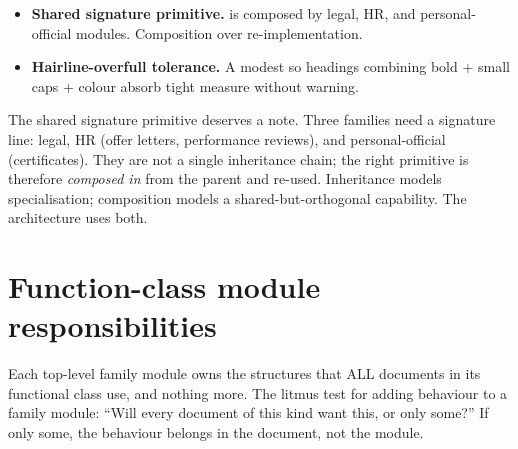 \documentclass[11pt]{article}
\begin{document}
\begin{itemize}
         stamps out a tcolorbox-backed,
        counter-driven, optionally-titled environment in a single line.
        Three legal callouts, four installation steps, an ADR header,
        and the test-case header all use the same factory.
  \item \textbf{Shared signature primitive.} 
        is composed by legal, HR, and personal-official modules.
        Composition over re-implementation.
  \item \textbf{Hairline-overfull tolerance.} A modest
         so headings combining bold + small caps +
        colour absorb tight measure without warning.
\end{itemize}

\begin{notebox}
The shared signature primitive deserves a note. Three families need a
signature line: legal, HR (offer letters, performance reviews),
and personal-official (certificates). They are not a single inheritance
chain; the right primitive is therefore \emph{composed in} from the
parent and re-used. Inheritance models specialisation; composition
models a shared-but-orthogonal capability. The architecture uses both.
\end{notebox}

\section{Function-class module responsibilities}

Each top-level family module owns the structures that ALL documents in
its functional class use, and nothing more. The litmus test for adding
behaviour to a family module: ``Will every document of this kind want
this, or only some?'' If only some, the behaviour belongs in the
document, not the module.

\begin{traceability}
\end{traceability}
\end{document}
